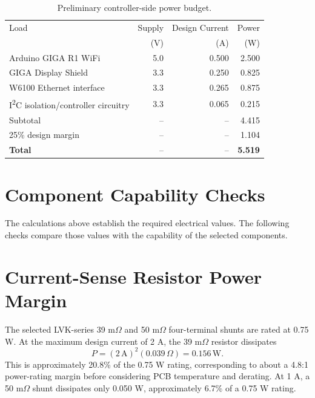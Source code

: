 \begin{table}[H]
    \centering
    \caption{Preliminary controller-side power budget.}
    \label{tab:power-budget}
    \begin{tabular}{lrrr}
        \toprule
        Load & Supply & Design Current & Power \\
        & (V) & (A) & (W) \\
        \midrule
        Arduino GIGA R1 WiFi
        & 5.0 & 0.500 & 2.500 \\

        GIGA Display Shield
        & 3.3 & 0.250 & 0.825 \\

        W6100 Ethernet interface
        & 3.3 & 0.265 & 0.875 \\

        I\textsuperscript{2}C isolation/controller circuitry
        & 3.3 & 0.065 & 0.215 \\
        \midrule
        Subtotal
        & -- & -- & 4.415 \\

        25\% design margin
        & -- & -- & 1.104 \\
        \midrule
        \textbf{Total}
        & -- & -- & \textbf{5.519} \\
        \bottomrule
    \end{tabular}
\end{table}



\section{Component Capability Checks}
\label{sec:component-capability}
The calculations above establish the required electrical values. The following
checks compare those values with the capability of the selected components.

\section{Current-Sense Resistor Power Margin}
The selected LVK-series 39 m\(\Omega\) and 50 m\(\Omega\) four-terminal shunts
are rated at 0.75 W. At the maximum design current of 2 A, the 39 m\(\Omega\)
resistor dissipates
\begin{equation}
    P=(2\,\mathrm{A})^2(0.039\,\Omega)=0.156\,\mathrm{W}.
\end{equation}
This is approximately 20.8\% of the 0.75 W rating, corresponding to about a
4.8:1 power-rating margin before considering PCB temperature and derating. At
1 A, a 50 m\(\Omega\) shunt dissipates only 0.050 W, approximately 6.7\% of a
0.75 W rating.


